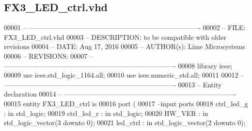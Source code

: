 \subsection{F\+X3\+\_\+\+L\+E\+D\+\_\+ctrl.\+vhd}
\label{FX3__LED__ctrl_8vhd_source}

\begin{DoxyCode}
00001 \textcolor{keyword}{-- ---------------------------------------------------------------------------- }
00002 \textcolor{keyword}{-- FILE:    FX3\_LED\_ctrl.vhd}
00003 \textcolor{keyword}{-- DESCRIPTION: to be compatible with older revisions}
00004 \textcolor{keyword}{-- DATE:    Aug 17, 2016}
00005 \textcolor{keyword}{-- AUTHOR(s):   Lime Microsystems}
00006 \textcolor{keyword}{-- REVISIONS:}
00007 \textcolor{keyword}{-- ---------------------------------------------------------------------------- }
00008 \textcolor{vhdlkeyword}{library }\textcolor{keywordflow}{ieee};
00009 \textcolor{vhdlkeyword}{use }ieee.std\_logic\_1164.\textcolor{keywordflow}{all};
00010 \textcolor{vhdlkeyword}{use }ieee.numeric\_std.\textcolor{keywordflow}{all};
00011 
00012 \textcolor{keyword}{-- ----------------------------------------------------------------------------}
00013 \textcolor{keyword}{-- Entity declaration}
00014 \textcolor{keyword}{-- ----------------------------------------------------------------------------}
00015 \textcolor{keywordflow}{entity }FX3_LED_ctrl \textcolor{keywordflow}{is}
00016   \textcolor{keywordflow}{port} \textcolor{vhdlchar}{(}
00017 \textcolor{keyword}{        --input ports }
00018         \textcolor{vhdlchar}{ctrl_led_g}      \textcolor{vhdlchar}{:} \textcolor{keywordflow}{in} \textcolor{comment}{std\_logic};
00019         \textcolor{vhdlchar}{ctrl_led_r}      \textcolor{vhdlchar}{:} \textcolor{keywordflow}{in} \textcolor{comment}{std\_logic};
00020           \textcolor{vhdlchar}{HW_VER}                \textcolor{vhdlchar}{:} \textcolor{keywordflow}{in} \textcolor{comment}{std\_logic\_vector}\textcolor{vhdlchar}{(}\textcolor{vhdllogic}{}\textcolor{vhdllogic}{3} \textcolor{keywordflow}{downto} \textcolor{vhdllogic}{}\textcolor{vhdllogic}{0}\textcolor{vhdlchar}{)};
00021           \textcolor{vhdlchar}{led_ctrl}          \textcolor{vhdlchar}{:} \textcolor{keywordflow}{in} \textcolor{comment}{std\_logic\_vector}\textcolor{vhdlchar}{(}\textcolor{vhdllogic}{}\textcolor{vhdllogic}{2} \textcolor{keywordflow}{downto} \textcolor{vhdllogic}{}\textcolor{vhdllogic}{0}\textcolor{vhdlchar}{)};

\end{DoxyCode}
